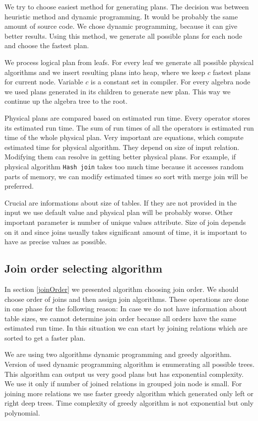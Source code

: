 We try to choose easiest method for generating plans. The decision was between heuristic method and dynamic programming. It would be probably the same amount of source code. We chose dynamic programming, because it can give better results. Using this method, we generate all possible plans for each node and choose the fastest plan.

We process logical plan from leafs. For every leaf we generate all possible physical algorithms and we insert resulting plans into heap, where we keep $c$ fastest plans for current node. Variable $c$ is a constant set in compiler.
For every algebra node we used plans generated in its children to generate new plan. This way we continue up the algebra tree to the root.

Physical plans are compared based on estimated run time. Every operator stores its estimated run time. The sum of run times of all the operators is estimated run time of the whole physical plan.
Very important are equations, which compute estimated time for physical algorithm. They depend on size of input relation. Modifying them can resolve in getting better physical plans. For example, if physical algorithm \texttt{Hash join} takes too much time because it accesses random parts of memory, we can modify estimated times so sort with merge join will be preferred.

Crucial are informations about size of tables. If they are not provided in the input we use default value and physical plan will be probably worse. Other important parameter is number of unique values attribute. Size of join depends on it and since joins usually takes significant amount of time, it is important to have as precise values as possible. 

\subsection{Join order selecting algorithm}


In section \ref{joinOrder} we presented algorithm choosing join order. We should choose order of joins and then assign join algorithms. These operations are done in one phase for the following reason: In case we do not have information about table sizes, we cannot determine join order because all orders have the same estimated run time. In this situation we can start by joining relations which are sorted to get a faster plan.

We are using two algorithms dynamic programming and greedy algorithm. Version of used dynamic programming algorithm is enumerating all possible trees. This algorithm can output us very good plans but has exponential complexity. We use it only if number of joined relations in grouped join node is small. For joining more relations we use faster greedy algorithm which generated only left or right deep trees. Time complexity of greedy algorithm is not exponential but only polynomial.


